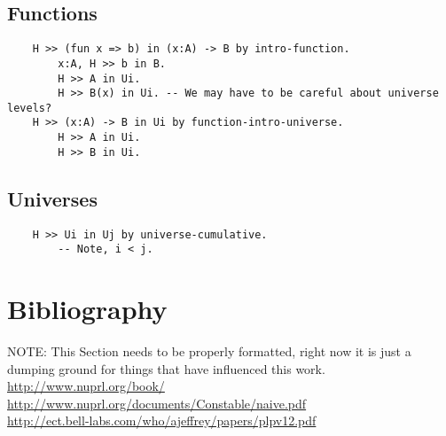 \documentclass{article}
\begin{document}
\subsection{Functions}
\begin{verbatim}
    H >> (fun x => b) in (x:A) -> B by intro-function.
        x:A, H >> b in B.
        H >> A in Ui.
        H >> B(x) in Ui. -- We may have to be careful about universe levels?
    H >> (x:A) -> B in Ui by function-intro-universe.
        H >> A in Ui.
        H >> B in Ui.
\end{verbatim}
\subsection{Universes}
\begin{verbatim}
    H >> Ui in Uj by universe-cumulative.
        -- Note, i < j.
\end{verbatim}

\section{Bibliography}
{\color{red} NOTE:} This Section needs to be properly formatted, right now it is just a dumping ground for things that have influenced this work.\\
\url{http://www.nuprl.org/book/} \\
\url{http://www.nuprl.org/documents/Constable/naive.pdf} \\
\url{http://ect.bell-labs.com/who/ajeffrey/papers/plpv12.pdf} \\
\end{document}

